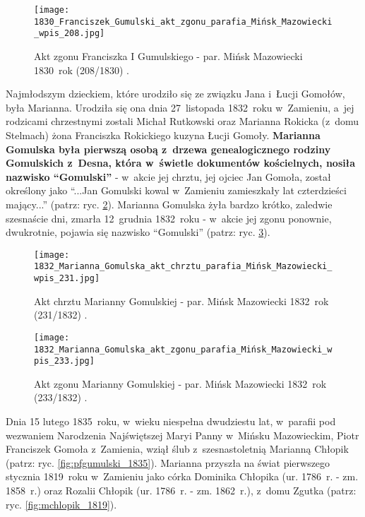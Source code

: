 \begin{figure}[!ht]
    \vspace*{0.5cm}
    \centering \texttt{[image: 
        1830\_Franciszek\_Gumulski\_akt\_zgonu\_parafia\_Mińsk\_Mazowiecki\_wpis\_208.jpg]}
    \captionsetup{format=hang}
    \caption{Akt zgonu Franciszka I Gumulskiego - par. Mińsk Mazowiecki 
    1830~rok (208/1830) \cite{par_minsk2}.}
    \label{fig:fgumulski_1830_2}
\end{figure}

Najmłodszym dzieckiem, które urodziło się ze związku Jana i~Łucji Gomołów, 
była Marianna. Urodziła się ona dnia 27~listopada 1832~roku w~Zamieniu, a~jej 
rodzicami chrzestnymi zostali Michał Rutkowski oraz Marianna Rokicka (z~domu 
Stelmach) żona Franciszka Rokickiego kuzyna Łucji Gomoły. \textbf{Marianna 
Gomulska była pierwszą osobą z~drzewa genealogicznego rodziny Gomulskich 
z~Desna, która w~świetle dokumentów kościelnych, nosiła nazwisko 
\enquote{Gomulski}} - w~akcie jej chrztu, jej ojciec Jan Gomoła, został 
określony jako \enquote{...Jan Gomulski kowal w~Zamieniu zamieszkały lat 
czterdzieści mający...} (patrz: ryc. \ref{fig:mgomulska_1832_1}). Marianna 
Gomulska żyła bardzo krótko, zaledwie szesnaście dni, zmarła 12~grudnia 
1832~roku - w~akcie jej zgonu ponownie, dwukrotnie, pojawia się nazwisko 
\enquote{Gomulski} (patrz: ryc. \ref{fig:mgomulska_1832_2}).

\begin{figure}[!ht]
    \vspace*{0.5cm}
    \centering \texttt{[image: 
        1832\_Marianna\_Gomulska\_akt\_chrztu\_parafia\_Mińsk\_Mazowiecki\_wpis\_231.jpg]}
    \captionsetup{format=hang}
    \caption{Akt chrztu Marianny Gomulskiej - par. Mińsk Mazowiecki 1832~rok 
    (231/1832) \cite{par_minsk2}.}
    \label{fig:mgomulska_1832_1}
\end{figure}

\begin{figure}[!ht]
    \vspace*{0.5cm}
    \centering \texttt{[image: 
        1832\_Marianna\_Gomulska\_akt\_zgonu\_parafia\_Mińsk\_Mazowiecki\_wpis\_233.jpg]}
    \captionsetup{format=hang}
    \caption{Akt zgonu Marianny Gomulskiej - par. Mińsk Mazowiecki 1832~rok 
    (233/1832) \cite{par_minsk2}.}
    \label{fig:mgomulska_1832_2}
\end{figure}

Dnia 15 lutego 1835~roku, w~wieku niespełna dwudziestu lat, w~parafii pod 
wezwaniem Narodzenia Najświętszej Maryi Panny w~Mińsku Mazowieckim, Piotr 
Franciszek Gomoła z~Zamienia, wziął ślub z~szesnastoletnią Marianną Chłopik 
(patrz: ryc. \ref{fig:pfgumulski_1835}). Marianna przyszła na świat 
pierwszego stycznia 1819~roku w~Zamieniu jako córka Dominika Chłopika (ur. 
1786~r. - zm. 1858~r.) oraz Rozalii Chłopik (ur. 1786~r. - zm. 1862~r.), 
z~domu Zgutka (patrz: ryc. \ref{fig:mchlopik_1819}). 

